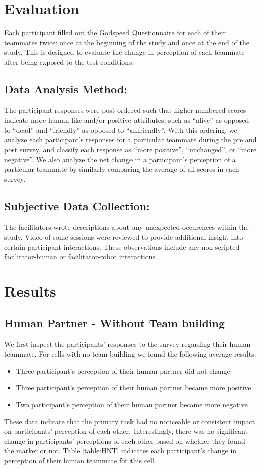 \documentclass{acm_proc_article-sp}
\begin{document}
\section{Evaluation}
\label{section:objective-evaluation}
Each participant filled out the Godspeed Questionnaire for each of their teammates twice: once at the beginning of the study and once at the end of the study. This is designed to evaluate the change in perception of each teammate after being exposed to the test conditions.
\subsection{Data Analysis Method:}
The participant responses were post-ordered such that higher numbered scores indicate more human-like and/or positive attributes, such as ``alive'' as opposed to ``dead'' and ``friendly'' as opposed to ``unfriendly''. With this ordering, we analyze each participant's responses for a particular teammate during the pre and post survey, and classify each response as ``more positive'', ``unchanged'', or ``more negative''. We also analyze the net change in a participant's perception of a particular teammate by similarly comparing the average of all scores in each survey.

\subsection{Subjective Data Collection:}
The facilitators wrote descriptions about any unexpected occurences within the study. Video of some sessions were reviewed to provide additional insight into certain participant interactions. These observations include any non-scripted facilitator-human or facilitator-robot interactions. 

\section{Results}
\label{section:results}

\subsection{Human Partner - Without Team building}
We first inspect the participants' responses to the survey regarding their human teammate. For cells with no team building we found the following average results:
\begin{itemize}
 \item Three participant's perception of their human partner did not change
 \item Three participant's perception of their human partner became more positive
 \item Two participant's perception of their human partner became more negative
\end{itemize}
These data indicate that the primary task had no noticeable or consistent impact on participants' perception of each other. Interestingly, there was no significant change in participants' perceptions of each other based on whether they found the marker or not.  Table \ref{table:HNT} indicates each participant's change in perception of their human teammate for this cell.
\end{document}
